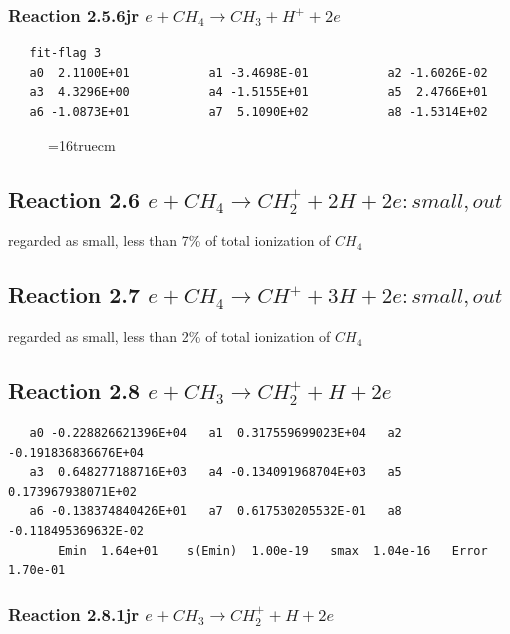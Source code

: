 \documentclass[12pt,dvipdfmx]{article}
\begin{document}
\subsubsection{
Reaction 2.5.6jr     $e + CH_{4} \rightarrow CH_{3} + H^{+} + 2e $
}

\begin{small}\begin{verbatim}
   fit-flag 3
   a0  2.1100E+01           a1 -3.4698E-01           a2 -1.6026E-02
   a3  4.3296E+00           a4 -1.5155E+01           a5  2.4766E+01
   a6 -1.0873E+01           a7  5.1090E+02           a8 -1.5314E+02
 \end{verbatim}\end{small}


\begin{figure} \label{met.1_2.5_2.6_2.7}
\epsfxsize=16truecm
\end{figure}
\newpage

\subsection{
Reaction 2.6
$e + CH_{4} \rightarrow CH_{2}^+ + 2 H + 2e: small, out $
}
regarded as small, less than 7\% of total ionization of $CH_4$

\subsection{
Reaction 2.7
$e + CH_{4} \rightarrow CH^+ + 3 H + 2e: small, out $
}
regarded as small, less than 2\% of total ionization of $CH_4$

\subsection{
Reaction 2.8      $e + CH_3 \rightarrow  CH_2^+ + H + 2e $
}

\begin{small}\begin{verbatim}
   a0 -0.228826621396E+04   a1  0.317559699023E+04   a2 -0.191836836676E+04
   a3  0.648277188716E+03   a4 -0.134091968704E+03   a5  0.173967938071E+02
   a6 -0.138374840426E+01   a7  0.617530205532E-01   a8 -0.118495369632E-02
       Emin  1.64e+01    s(Emin)  1.00e-19   smax  1.04e-16   Error  1.70e-01
\end{verbatim}\end{small}


\subsubsection{
Reaction 2.8.1jr    $e + CH_{3} \rightarrow CH_{2}^{+} + H + 2e $
}
\end{document}
